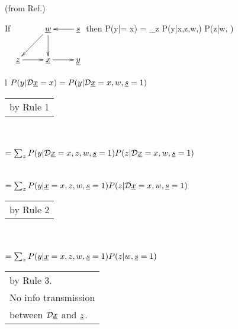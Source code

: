 \begin{claim}(from Ref.\cite{hunermund2021})

If $
\xymatrix{
&\rvw\ar[dl]\ar[d]
&\rvs\ar[l]
\\
\rvz\ar[r]
&\rvx\ar[r]
&\rvy
}$ then
\beq
P(y|\cald \rvx = x)
=
 \sum_z P(y|x,z,w,)
P(z|w, )
\eeq

\beq
{}
\eeq
\end{claim}
\proof
\begin{longtable}{l}
\color{red}
$P(y|{\cal D}{\underline{x}}=x)=P(y|{\cal D}{\underline{x}}=x, w, {\underline{s}}=1)$
\\
\xymatrix{
\\
=
}
\begin{tabular}{l}
by Rule 1
\end{tabular}
\\
\\
\color{red}
$=\sum_z P(y|{\cal D}{\underline{x}}=x,z,w,{\underline{s}}=1)
P(z|{\cal D}{\underline{x}}=x, w, {\underline{s}}=1)$
\\
\xymatrix{\\=}
\\
\\
\color{red}
$=\sum_z P(y|{\underline{x}}=x,z,w,{\underline{s}}=1)
P(z|{\cal D}{\underline{x}}=x, w, {\underline{s}}=1)$
\\
\xymatrix{\\=}
\begin{tabular}{l}
\\
by Rule 2
\end{tabular}
\\
\\
\color{red}
$=\sum_z P(y|{\underline{x}}=x,z,w,{\underline{s}}=1)
P(z| w, {\underline{s}}=1)$
\\
\xymatrix{\\=}
\begin{tabular}{l}\\
by Rule 3.
\\
No info transmission\\
between ${\cal D} {\underline{x}}$ and ${\underline{z}}$.
\end{tabular}
\end{longtable}

